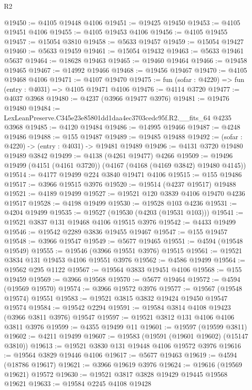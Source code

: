 \begin{lexlean}{R2}
\begin{coremodule}
@19450 := @4105 @19448 @4106
@19451 := @19425 @19450
@19453 := @4105 @19451 @4106
@19455 := @4105 @19453 @4106
@19456 := @4105 @19455
@19457 := @15054 @3810
@19458 := @5633 @19457
@19459 := @15054 @19427
@19460 := @5633 @19459
@19461 := @15054 @19432
@19463 := @5633 @19461 @5637
@19464 := @18628 @19463
@19465 := @19460 @19464
@19466 := @19458 @19465
@19467 := @14992 @19466
@19468 := @19456 @19467
@19470 := @4105 @19468 @4106
@19471 := @4107 @19470
@19475 := fun (sofar : @4220) => fun (entry : @4031) => @4105 @19471 @4106
@19476 := @4114 @3720
@19477 := @4037 @3968
@19480 := @4237 (@3966 @19477 @3976)
@19481 := @19476 @19480
@19484 := LexLeanPreserve.C345e23e85801dd1daa4ec3703cedc95f.R2.__fits_64 @4235 @3968
@19485 := @4120 @19484
@19486 := @14995 @19466
@19487 := @4248 @19486
@19488 := @155 @19487
@19489 := @19485 @19488
@19492 := (sofar : @4220) -> (entry : @4031) -> @19481 @19489
@19496 := @4131 @3720 @19480 @19489 @3842
@19499 := @4138 (@4261 @19477) @4266
@19509 := @19496 @19499 (@4151 (@4161 @3720)) (@4167 (@4168 (@4169 @3842) @19480 @4145))
@19514 := @4177 @19499 @224 @3840 @19471 @4106
@19515 := @155 @19486
@19517 := @3966 @19515 @3976
@19520 := @19514 (@4237 @19517) @19488
@19521 := @4189 @19499
@19527 := @19521 @120 @3839 @4106 @19470 @4236 @19517
@19528 := @4198 @19499
@19530 := @19528 @103 @4236
@19531 := @4204 @19499
@19535 := @19527 (@19530 (@4203 (@19531 @103)))
@19541 := @19521 @3837 @131 @19468 @4106 @19515 @3976
@19542 := @4433 @19499
@19546 := @19542 @2289 @3836 @19455 @19467
@19547 := @155 @19457
@19548 := @3966 @19547
@19549 := @5677 @19465
@19551 := @4594 (@19548 @19549)
@19555 := @19546 (@3966 @19551 @3976) @19515
@19561 := @19521 @3834 @131 @19453 @4106 @19551 @3976
@19562 := @4586 @19499
@19564 := @19562 @295 @1122
@19567 := @19564 @3833 @19451 @4106
@19568 := @155 @19459
@19569 := @3966 @19568
@19570 := @5677 @19464
@19572 := @4594 (@19569 @19570)
@19574 := @3966 @19572 @3976
@19577 := @19567 (@19548 @19574) @19551
@19583 := @19521 @3815 @3832 @19424 @19450 @19547 @19574
@19584 := @19542 @2294
@19591 := @19584 @3814 @4108 @19423 (@3966 @3811 @3976) @19547
@19597 := @19521 @3812 @131 @4106 @4106 @3811 @3976
@19599 := @4355 @19499 @11
@19601 := @19597 (@19599 @3811)
@19602 := @4211 @19499
@19607 := @19583 (@19591 (@19601 @19602) (@15147 @3810))
@19613 := @19521 @3830 @131 @19448 @4106 @19572 @3976
@19616 := @19564 @3829 @19446 @4106
@19617 := @5677 @19463
@19619 := @4594 (@18786 @19617)
@19621 := @3966 @19619 @3976
@19624 := @19616 (@19569 @19621) @19572
@19630 := @19521 @3817 @3828 @19429 @19445 @19568 @19621
@19633 := @19584 @2245 @4108 @19428

\end{coremodule}
\end{lexlean}
